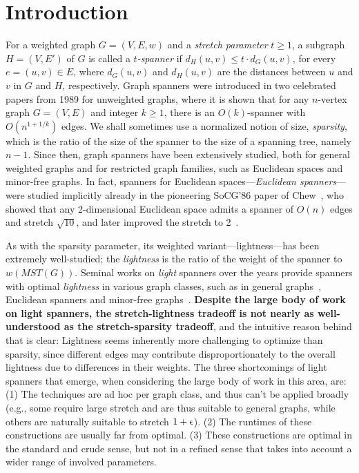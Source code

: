 
\section{Introduction}\label{sec:intro}

For a weighted graph $G = (V,E,w)$ and a {\em stretch parameter} $t \ge 1$, a subgraph $H = (V,E')$ of $G$
is called a \emph{$t$-spanner} if $d_H(u,v) \le t \cdot d_G(u,v)$, for every $e = (u,v) \in E$,
where $d_G(u,v)$ and $d_H(u,v)$ are the distances between $u$ and $v$ in $G$ and $H$, respectively.
Graph spanners were introduced in two celebrated papers from 1989 \cite{PS89,PU89} for unweighted graphs,
where it is shown that for any $n$-vertex graph $G = (V,E)$ and integer $k \ge 1$, there is an $O(k)$-spanner with $O(n^{1+ 1/k})$ edges.
We shall sometimes use a normalized notion of size, {\em sparsity}, which is the ratio of the size of the spanner to the size of a spanning tree, namely $n-1$.
Since then, graph spanners have been extensively studied, both for general weighted graphs and for restricted graph families,
such as Euclidean spaces and minor-free graphs.  
In fact, spanners for Euclidean spaces---{\em Euclidean spanners}---were studied implicitly already in the pioneering SoCG'86 paper of Chew~\cite{Chew86}, who showed that any 2-dimensional Euclidean space admits a spanner of $O(n)$ edges and stretch $\sqrt{10}$, and later improved the stretch to 2~\cite{Chew89}.


As with the sparsity parameter, its weighted variant---lightness---has been extremely well-studied; the \emph{lightness} is the ratio of the weight of the spanner to $w(MST(G))$. 
Seminal works on {\em light} spanners over the years provide spanners with optimal {\em lightness} in various graph classes, such as in general graphs~\cite{CW16}, Euclidean spanners \cite{das1994fast} and minor-free graphs~\cite{BLW17}.
{\bf Despite the large body of work on light spanners,  the stretch-lightness tradeoff is not nearly as well-understood as the stretch-sparsity tradeoff}, and the intuitive reason behind that is clear: Lightness seems inherently more challenging to optimize than sparsity, since different edges may contribute disproportionately to the overall lightness due to differences in their weights.  The three shortcomings of light spanners that emerge, when considering the large body of work in this area, are: (1) The techniques are ad hoc per graph class, and thus can't be applied broadly 
(e.g., some require large stretch and are thus suitable to general graphs, while others are naturally suitable to stretch $1 + \epsilon$). 
(2) The runtimes of these constructions are usually far from optimal.
(3) These constructions are optimal in the standard and crude sense, but not in a refined sense that takes into account a wider range of involved parameters.

